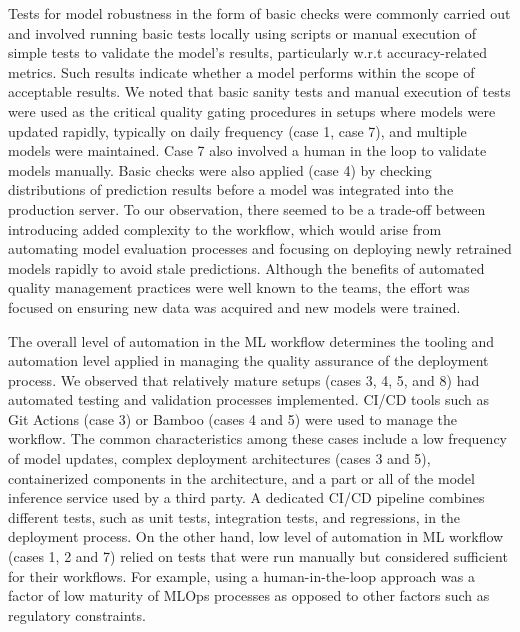 Tests for model robustness in the form of basic checks were commonly carried out and involved running basic tests locally using scripts or manual execution of simple tests to validate the model's results, particularly w.r.t accuracy-related metrics. Such results indicate whether a model performs within the scope of acceptable results. We noted that basic sanity tests and manual execution of tests were used as the critical quality gating procedures in setups where models were updated rapidly, typically on daily frequency (case 1, case 7), and multiple models were maintained. Case 7 also involved a human in the loop to validate models manually. Basic checks were also applied (case 4) by checking distributions of prediction results before a model was integrated into the production server. To our observation, there seemed to be a trade-off between introducing added complexity to the workflow, which would arise from automating model evaluation processes and focusing on deploying newly retrained models rapidly to avoid stale predictions. Although the benefits of automated quality management practices were well known to the teams, the effort was focused on ensuring new data was acquired and new models were trained. %

The overall level of automation in the ML workflow determines the tooling and automation level applied in managing the quality assurance of the deployment process. We observed that relatively mature setups (cases 3, 4, 5, and 8) had automated testing and validation processes implemented.  CI/CD tools such as Git Actions (case 3) or Bamboo (cases 4 and 5) were used to manage the workflow. The common characteristics among these cases include a low frequency of model updates, complex deployment architectures (cases 3 and 5), containerized components in the architecture, and a part or all of the model inference service used by a third party. A dedicated CI/CD pipeline combines different tests, such as unit tests, integration tests, and regressions, in the deployment process. On the other hand, low level of automation in ML workflow %
(cases 1, 2 and 7) relied on tests that were run manually but considered sufficient for their workflows. For example, using a human-in-the-loop approach was a factor of low maturity of MLOps processes as opposed to other factors such as regulatory constraints.

